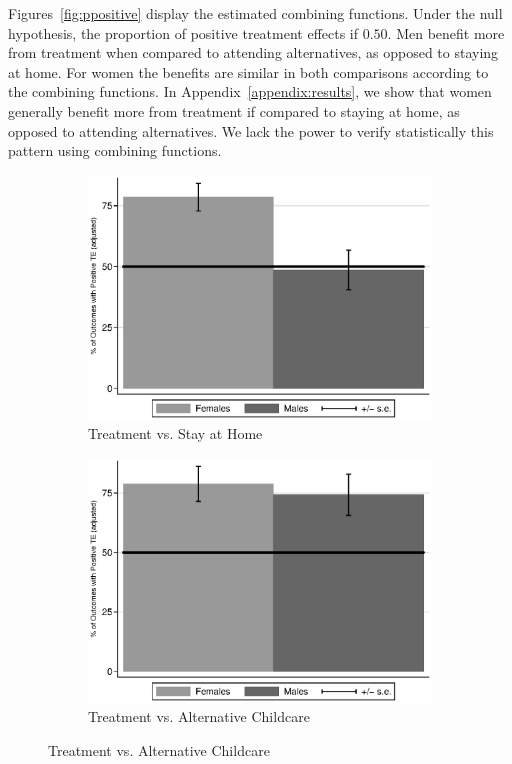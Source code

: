 Figures~\ref{fig:ppositive} display the estimated combining functions. Under the null hypothesis, the proportion of positive treatment effects if $0.50$. Men benefit more from treatment when compared to attending alternatives, as opposed to staying at home. For women the benefits are similar in both comparisons according to the combining functions. In Appendix~\ref{appendix:results}, we show that women generally benefit more from treatment if compared to staying at home, as opposed to attending alternatives. We lack the power to verify statistically this pattern using combining functions. 


\begin{figure}
\centering
\caption{Positively Impacted Outcomes, ABC/CARE Males and Females}\label{fig:ppositive}
\begin{subfigure}[h]{0.49\textwidth}
		\centering
		\caption{ Treatment vs. Stay at Home} \label{fig:ppositivehome}
		\includegraphics[width=\textwidth]{output/epan_ipw_p0_all.eps}
\end{subfigure}%
\begin{subfigure}[h]{0.49\textwidth}
	\centering
	\caption{Treatment vs. Alternative Childcare} \label{fig:ppositivealternative}
		\includegraphics[width=\textwidth]{output/epan_ipw_p1_all.eps}

\end{subfigure}
\end{figure}
